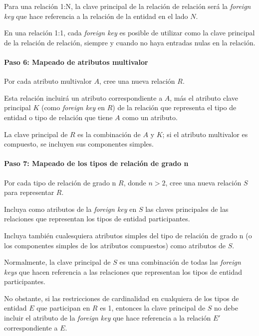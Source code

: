 Para una relación 1:N, la clave principal de la relación de relación será la \textit{foreign key} que hace referencia a la relación de la entidad en el lado $N$.


En una relación 1:1, cada \textit{foreign key} es posible de utilizar como la clave principal de la relación de relación, siempre y cuando no haya entradas nulas en la relación.


\paragraph*{Paso 6: Mapeado de atributos multivalor}

Por cada atributo multivalor $A$, cree una nueva relación $R$.


Esta relación incluirá un atributo correspondiente a $A$, más el atributo clave principal $K$ (como \textit{foreign key} en $R$) de la relación que representa el tipo de entidad o tipo de relación que tiene $A$ como un atributo.


La clave principal de $R$ es la combinación de $A$ y $K$; si el atributo multivalor es compuesto, se incluyen sus componentes simples.


\paragraph*{Paso 7: Mapeado de los tipos de relación de grado n}
Por cada tipo de relación de grado n $R$, donde $n > 2$, cree una nueva relación $S$ para representar $R$.


Incluya como atributos de la \textit{foreign key} en $S$ las claves principales de las relaciones que representan los tipos de entidad participantes. 


Incluya también cualesquiera atributos simples del tipo de relación de grado n (o los componentes simples de los atributos compuestos) como atributos de $S$.


Normalmente, la clave principal de $S$ es una combinación de todas las \textit{foreign keys} que hacen referencia a las relaciones que representan los tipos de entidad participantes.


No obstante, si las restricciones de cardinalidad en cualquiera de los tipos de entidad $E$ que participan en $R$ es 1, entonces la clave principal de $S$ no debe incluir el atributo de la \textit{foreign key} que hace referencia a la relación $E'$ correspondiente a $E$.


